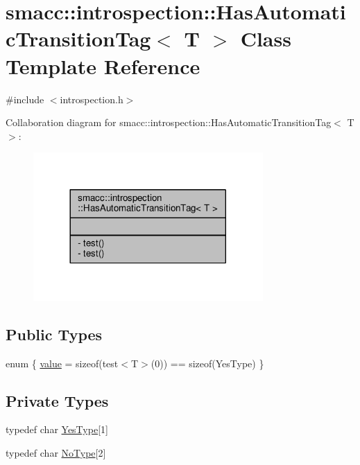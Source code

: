 \hypertarget{classsmacc_1_1introspection_1_1HasAutomaticTransitionTag}{}\section{smacc\+:\+:introspection\+:\+:Has\+Automatic\+Transition\+Tag$<$ T $>$ Class Template Reference}
\label{classsmacc_1_1introspection_1_1HasAutomaticTransitionTag}


{\ttfamily \#include $<$introspection.\+h$>$}



Collaboration diagram for smacc\+:\+:introspection\+:\+:Has\+Automatic\+Transition\+Tag$<$ T $>$\+:\nopagebreak
\begin{figure}[H]
\begin{center}
\leavevmode
\includegraphics[width=248pt]{classsmacc_1_1introspection_1_1HasAutomaticTransitionTag__coll__graph}
\end{center}
\end{figure}
\subsection*{Public Types}
\begin{DoxyCompactItemize}
\item 
enum \{ \hyperlink{classsmacc_1_1introspection_1_1HasAutomaticTransitionTag_aa4d176f174bc660b4705a0ff3874d4aca4e813bb149aec14797ea59791542e845}{value} = sizeof(test$<$T$>$(0)) == sizeof(Yes\+Type)
 \}
\end{DoxyCompactItemize}
\subsection*{Private Types}
\begin{DoxyCompactItemize}
\item 
typedef char \hyperlink{classsmacc_1_1introspection_1_1HasAutomaticTransitionTag_a750a08a185de0fa20331ba7cfc531dde}{Yes\+Type}\mbox{[}1\mbox{]}
\item 
typedef char \hyperlink{classsmacc_1_1introspection_1_1HasAutomaticTransitionTag_ab81e7f76862ba064df3fd8e78b3864c4}{No\+Type}\mbox{[}2\mbox{]}
\end{DoxyCompactItemize}
